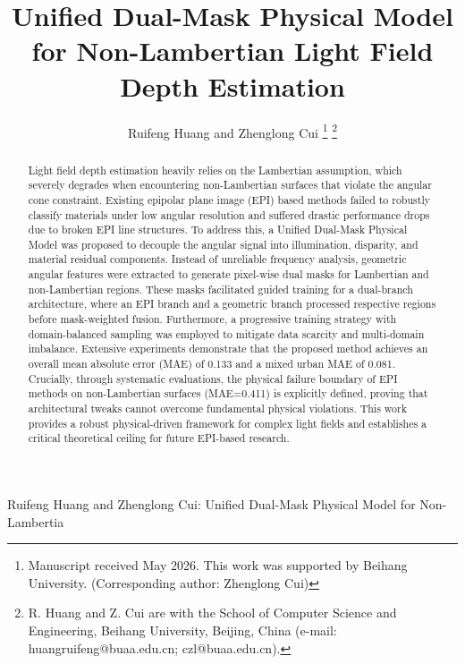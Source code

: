 \documentclass[lettersize,journal]{IEEEtran}
\begin{document}
\title{Unified Dual-Mask Physical Model for Non-Lambertian Light Field Depth Estimation}

\author{Ruifeng Huang and Zhenglong Cui
\thanks{Manuscript received May 2026. This work was supported by Beihang University. (Corresponding author: Zhenglong Cui)}
\thanks{R. Huang and Z. Cui are with the School of Computer Science and Engineering, Beihang University, Beijing, China (e-mail: huangruifeng@buaa.edu.cn; czl@buaa.edu.cn).}}

%
{Ruifeng Huang and Zhenglong Cui: Unified Dual-Mask Physical Model for Non-Lambertia}

\maketitle

\begin{abstract}
Light field depth estimation heavily relies on the Lambertian assumption, which severely degrades when encountering non-Lambertian surfaces that violate the angular cone constraint. Existing epipolar plane image (EPI) based methods failed to robustly classify materials under low angular resolution and suffered drastic performance drops due to broken EPI line structures. To address this, a Unified Dual-Mask Physical Model was proposed to decouple the angular signal into illumination, disparity, and material residual components. Instead of unreliable frequency analysis, geometric angular features were extracted to generate pixel-wise dual masks for Lambertian and non-Lambertian regions. These masks facilitated guided training for a dual-branch architecture, where an EPI branch and a geometric branch processed respective regions before mask-weighted fusion. Furthermore, a progressive training strategy with domain-balanced sampling was employed to mitigate data scarcity and multi-domain imbalance. Extensive experiments demonstrate that the proposed method achieves an overall mean absolute error (MAE) of 0.133 and a mixed urban MAE of 0.081. Crucially, through systematic evaluations, the physical failure boundary of EPI methods on non-Lambertian surfaces (MAE=0.411) is explicitly defined, proving that architectural tweaks cannot overcome fundamental physical violations. This work provides a robust physical-driven framework for complex light fields and establishes a critical theoretical ceiling for future EPI-based research.
\end{abstract}
\end{document}
